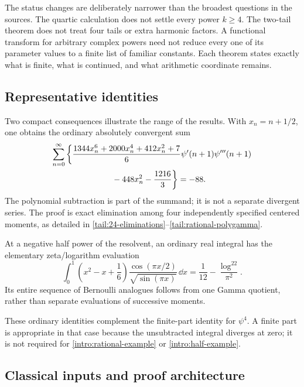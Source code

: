 The status changes are deliberately narrower than the broadest
questions in the sources. The quartic calculation does not settle
every power $k\ge4$. The two-tail theorem does not treat four tails
or extra harmonic factors. A functional transform for arbitrary
complex powers need not reduce every one of its parameter values to
a finite list of familiar constants. Each theorem states exactly
what is finite, what is continued, and what arithmetic coordinate
remains.

\subsection{Representative identities}

Two compact consequences illustrate the range of the results.
With $x_n=n+1/2$, one obtains the ordinary absolutely convergent sum
\begin{equation}\label{intro:rational-example}
\begin{aligned}
\sum_{n=0}^{\infty}\bigg\{&
\frac{1344x_n^6+2000x_n^4+412x_n^2+7}{6}
                  \psi'(n+1)\psi'''(n+1)\\
&\hspace{17mm}-448x_n^2-\frac{1216}{3}\bigg\}=-88.
\end{aligned}
\end{equation}
The polynomial subtraction is part of the summand; it is not a
separate divergent series. The proof is exact elimination among
four independently specified centered moments, as detailed in
\eqref{tail:24-eliminations}--\eqref{tail:rational-polygamma}.

At a negative half power of the resolvent, an ordinary real integral
has the elementary zeta/logarithm evaluation
\begin{equation}\label{intro:half-example}
\int_0^1\left(x^2-x+\frac16\right)
       \frac{\cos(\pi x/2)}{\sqrt{\sin(\pi x)}}\,\dd x
       =\frac1{12}-\frac{\log^22}{\pi^2}.
\end{equation}
Its entire sequence of Bernoulli analogues follows from one Gamma
quotient, rather than separate evaluations of successive moments.

These ordinary identities complement the finite-part identity for
$\psi^4$. A finite part is appropriate in that case because the
unsubtracted integral diverges at zero; it is not required for
\eqref{intro:rational-example} or \eqref{intro:half-example}.

\subsection{Classical inputs and proof architecture}

